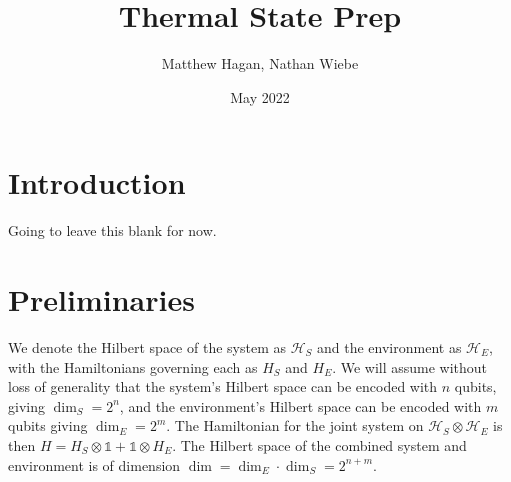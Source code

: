 \documentclass{article}
\title{Thermal State Prep}
\author{Matthew Hagan, Nathan Wiebe}
\date{May 2022}
\newcommand{\hilb}{\mathcal{H}}
\newcommand{\identity}{\mathds{1}}
\begin{document}
\maketitle

\tableofcontents

\section{Introduction}
Going to leave this blank for now. \cite{shiraishi_undecidability_2021}

\section{Preliminaries}
We denote the Hilbert space of the system as $\hilb_{S}$ and the environment as $\hilb_{E}$, with the Hamiltonians governing each as $H_{S}$ and $H_{E}$. We will assume without loss of generality that the system's Hilbert space can be encoded with $n$ qubits, giving $\dim_S = 2^{n}$, and the environment's Hilbert space can be encoded with $m$ qubits giving $\dim_E = 2^{m}$. The Hamiltonian for the joint system on $\hilb_{S} \otimes \hilb_{E}$ is then $H = H_{S} \otimes \identity + \identity \otimes H_{E}$. The Hilbert space of the combined system and environment is of dimension $\dim = \dim_E \cdot \dim_S = 2^{n + m}$. 
\end{document}
